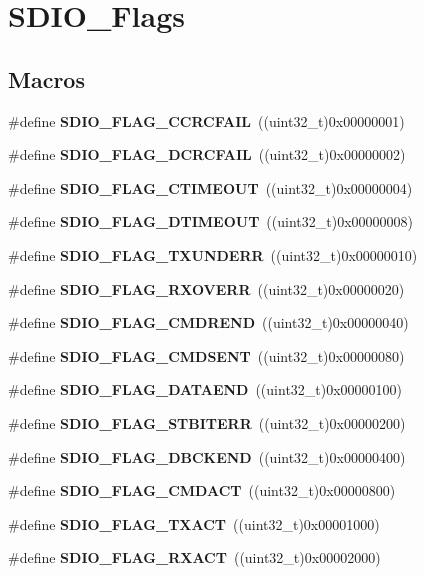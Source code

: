\section{S\+D\+I\+O\+\_\+\+Flags}
\label{group__SDIO__Flags}
\subsection*{Macros}
\begin{DoxyCompactItemize}
\item 
\#define \textbf{ S\+D\+I\+O\+\_\+\+F\+L\+A\+G\+\_\+\+C\+C\+R\+C\+F\+A\+IL}~((uint32\+\_\+t)0x00000001)
\item 
\#define \textbf{ S\+D\+I\+O\+\_\+\+F\+L\+A\+G\+\_\+\+D\+C\+R\+C\+F\+A\+IL}~((uint32\+\_\+t)0x00000002)
\item 
\#define \textbf{ S\+D\+I\+O\+\_\+\+F\+L\+A\+G\+\_\+\+C\+T\+I\+M\+E\+O\+UT}~((uint32\+\_\+t)0x00000004)
\item 
\#define \textbf{ S\+D\+I\+O\+\_\+\+F\+L\+A\+G\+\_\+\+D\+T\+I\+M\+E\+O\+UT}~((uint32\+\_\+t)0x00000008)
\item 
\#define \textbf{ S\+D\+I\+O\+\_\+\+F\+L\+A\+G\+\_\+\+T\+X\+U\+N\+D\+E\+RR}~((uint32\+\_\+t)0x00000010)
\item 
\#define \textbf{ S\+D\+I\+O\+\_\+\+F\+L\+A\+G\+\_\+\+R\+X\+O\+V\+E\+RR}~((uint32\+\_\+t)0x00000020)
\item 
\#define \textbf{ S\+D\+I\+O\+\_\+\+F\+L\+A\+G\+\_\+\+C\+M\+D\+R\+E\+ND}~((uint32\+\_\+t)0x00000040)
\item 
\#define \textbf{ S\+D\+I\+O\+\_\+\+F\+L\+A\+G\+\_\+\+C\+M\+D\+S\+E\+NT}~((uint32\+\_\+t)0x00000080)
\item 
\#define \textbf{ S\+D\+I\+O\+\_\+\+F\+L\+A\+G\+\_\+\+D\+A\+T\+A\+E\+ND}~((uint32\+\_\+t)0x00000100)
\item 
\#define \textbf{ S\+D\+I\+O\+\_\+\+F\+L\+A\+G\+\_\+\+S\+T\+B\+I\+T\+E\+RR}~((uint32\+\_\+t)0x00000200)
\item 
\#define \textbf{ S\+D\+I\+O\+\_\+\+F\+L\+A\+G\+\_\+\+D\+B\+C\+K\+E\+ND}~((uint32\+\_\+t)0x00000400)
\item 
\#define \textbf{ S\+D\+I\+O\+\_\+\+F\+L\+A\+G\+\_\+\+C\+M\+D\+A\+CT}~((uint32\+\_\+t)0x00000800)
\item 
\#define \textbf{ S\+D\+I\+O\+\_\+\+F\+L\+A\+G\+\_\+\+T\+X\+A\+CT}~((uint32\+\_\+t)0x00001000)
\item 
\#define \textbf{ S\+D\+I\+O\+\_\+\+F\+L\+A\+G\+\_\+\+R\+X\+A\+CT}~((uint32\+\_\+t)0x00002000)

\end{DoxyCompactItemize}
